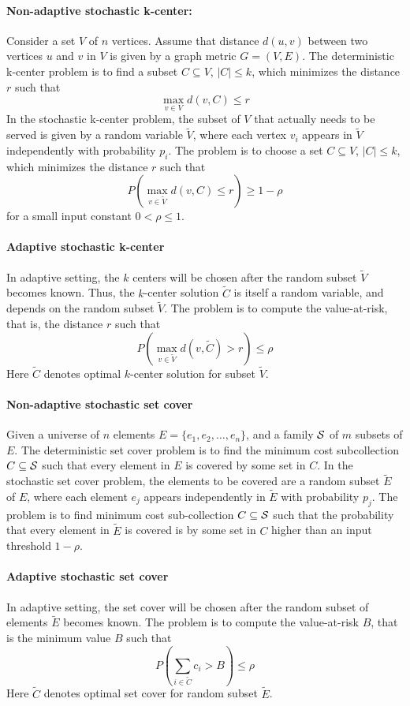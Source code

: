 \documentclass[11pt,onecolumn]{article}
\begin{document}
\paragraph{Non-adaptive stochastic k-center:} Consider a set $V$ of $n$ vertices. 
Assume that distance $d(u,v)$ between two vertices $u$ and $v$ in $V$ is given by a
graph metric $G=(V,E)$. The deterministic k-center problem is to find a subset $C \subseteq V$, $|C|\le k$, which minimizes the distance $r$ such that 
$$\max_{v\in V} d(v,C) \le r$$ 
In the stochastic k-center problem, the subset of $V$ that actually needs to be served is given by a random variable $\tilde{V}$, where each vertex $v_i$ appears in $\tilde{V}$ independently with probability $p_i$. 
The problem is to choose a set $C \subseteq V$, $|C|\le k$, which minimizes the distance $r$ such that 
$$P(\max_{v\in \tilde{V}} d(v,C) \le r) \ge 1-\rho$$ 
for a small input constant $0<\rho \le 1$.

\paragraph{Adaptive stochastic k-center}
In adaptive setting, the $k$ centers will be chosen after the random subset $\tilde{V}$ becomes known. Thus, the $k$-center solution $\tilde{C}$ is itself a random variable, and depends on the random subset $\tilde{V}$. The problem is to compute the value-at-risk, that is, the distance $r$ such that  
$$ P(\max_{v\in \tilde{V}} d(v,\tilde{C})> r) \le \rho$$
Here $\tilde{C}$ denotes optimal $k$-center solution for subset $\tilde{V}$.

\paragraph{Non-adaptive stochastic set cover}
Given a universe of $n$ elements $E=\{e_1, e_2, \ldots, e_n\}$, and a family ${\cal S}$ of $m$ subsets of $E$.
The deterministic set cover problem is to find the minimum cost subcollection $C \subseteq {\cal S}$ such that every element in $E$ is covered by some set in $C$. In the stochastic set cover problem, the elements to be covered are a random subset $\tilde{E}$ of $E$, where each element $e_j$ appears independently in $\tilde{E}$ with probability $p_j$. 
The problem is to find minimum cost sub-collection $C \subseteq {\cal S}$ such that the probability that every element in $\tilde{E}$ is covered is by some set in $C$ higher than an input threshold $1-\rho$.

\paragraph{Adaptive stochastic set cover}
In adaptive setting, the set cover will be chosen after the random subset of elements $\tilde{E}$ becomes known. 
The problem is to compute the value-at-risk $B$, that is the minimum value $B$ such that 
$$ P(\sum_{i \in \tilde{C}} c_i > B) \le \rho $$
Here $\tilde{C}$ denotes optimal set cover for random subset $\tilde{E}$.
\end{document}

